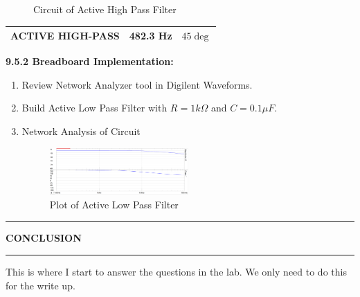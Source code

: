 \documentclass{article}
\begin{document}
\begin{enumerate}
\begin{figure}[H]
        \caption{Circuit of Active High Pass Filter}
    \end{figure}
    \begin{tabular}{|c|c|c|}
        \hline
        ACTIVE HIGH-PASS & 482.3 Hz & $45\deg$ \\
        \hline
        \end{tabular}
\end{enumerate}
\textbf{9.5.2 Breadboard Implementation:}
\begin{enumerate}
    \item Review Network Analyzer tool in Digilent Waveforms.
    \item Build Active Low Pass Filter with $R = 1k \Omega$ and $C = 0.1 \mu F$.
    \item Network Analysis of Circuit
    \begin{figure}[H]
        \centering
        \includegraphics[width=0.5\textwidth]{3physPlot.png}
        \caption{Plot of Active Low Pass Filter}
    \end{figure}
\end{enumerate}

\begin{center}
    \hrule
    \vspace{0.2cm}
    \textbf{\large CONCLUSION}
    \vspace{0.2cm}
    \hrule
\end{center}

This is where I start to answer the questions in the lab. We only need to do this for the write up.
\end{document}
